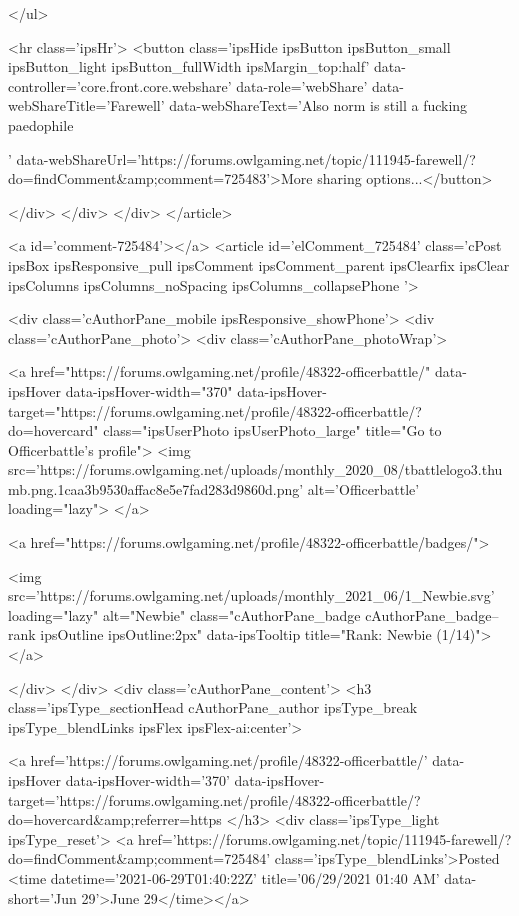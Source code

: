 	</ul>


	<hr class='ipsHr'>
	<button class='ipsHide ipsButton ipsButton_small ipsButton_light ipsButton_fullWidth ipsMargin_top:half' data-controller='core.front.core.webshare' data-role='webShare' data-webShareTitle='Farewell' data-webShareText='Also norm is still a fucking paedophile
 
' data-webShareUrl='https://forums.owlgaming.net/topic/111945-farewell/?do=findComment&amp;comment=725483'>More sharing options...</button>

	
</div>
</div>
	</div>
</article>
					
				
					
					
					



<a id='comment-725484'></a>
<article  id='elComment_725484' class='cPost ipsBox ipsResponsive_pull  ipsComment  ipsComment_parent ipsClearfix ipsClear ipsColumns ipsColumns_noSpacing ipsColumns_collapsePhone    '>
	

	

	<div class='cAuthorPane_mobile ipsResponsive_showPhone'>
		<div class='cAuthorPane_photo'>
			<div class='cAuthorPane_photoWrap'>
				


	<a href="https://forums.owlgaming.net/profile/48322-officerbattle/" data-ipsHover data-ipsHover-width="370" data-ipsHover-target="https://forums.owlgaming.net/profile/48322-officerbattle/?do=hovercard" class="ipsUserPhoto ipsUserPhoto_large" title="Go to Officerbattle's profile">
		<img src='https://forums.owlgaming.net/uploads/monthly_2020_08/tbattlelogo3.thumb.png.1caa3b9530affac8e5e7fad283d9860d.png' alt='Officerbattle' loading="lazy">
	</a>

				
				
					<a href="https://forums.owlgaming.net/profile/48322-officerbattle/badges/">
						
<img src='https://forums.owlgaming.net/uploads/monthly_2021_06/1_Newbie.svg' loading="lazy" alt="Newbie" class="cAuthorPane_badge cAuthorPane_badge--rank ipsOutline ipsOutline:2px" data-ipsTooltip title="Rank: Newbie (1/14)">
					</a>
				
			</div>
		</div>
		<div class='cAuthorPane_content'>
			<h3 class='ipsType_sectionHead cAuthorPane_author ipsType_break ipsType_blendLinks ipsFlex ipsFlex-ai:center'>
				


<a href='https://forums.owlgaming.net/profile/48322-officerbattle/' data-ipsHover data-ipsHover-width='370' data-ipsHover-target='https://forums.owlgaming.net/profile/48322-officerbattle/?do=hovercard&amp;referrer=https%
			</h3>
			<div class='ipsType_light ipsType_reset'>
				<a href='https://forums.owlgaming.net/topic/111945-farewell/?do=findComment&amp;comment=725484' class='ipsType_blendLinks'>Posted <time datetime='2021-06-29T01:40:22Z' title='06/29/2021 01:40  AM' data-short='Jun 29'>June 29</time></a>
				
